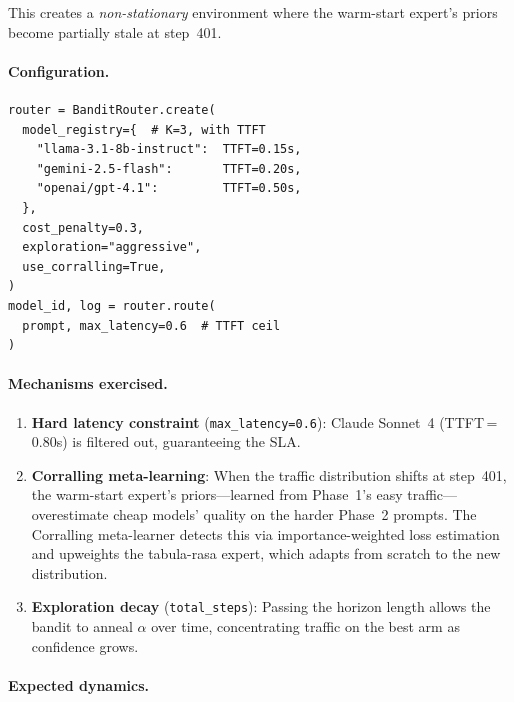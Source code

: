 \noindent This creates a \emph{non-stationary} environment where the warm-start expert's priors become partially stale at step~401.

\paragraph{Configuration.}

{\small\begin{verbatim}
router = BanditRouter.create(
  model_registry={  # K=3, with TTFT
    "llama-3.1-8b-instruct":  TTFT=0.15s,
    "gemini-2.5-flash":       TTFT=0.20s,
    "openai/gpt-4.1":         TTFT=0.50s,
  },
  cost_penalty=0.3,
  exploration="aggressive",
  use_corralling=True,
)
model_id, log = router.route(
  prompt, max_latency=0.6  # TTFT ceil
)
\end{verbatim}}

\paragraph{Mechanisms exercised.}

\begin{enumerate}[nosep,leftmargin=*]
    \item \textbf{Hard latency constraint} (\texttt{max\_latency=0.6}): Claude Sonnet~4 (TTFT\,=\,0.80s) is filtered out, guaranteeing the SLA.

    \item \textbf{Corralling meta-learning}: When the traffic distribution shifts at step~401, the warm-start expert's priors---learned from Phase~1's easy traffic---overestimate cheap models' quality on the harder Phase~2 prompts.  The Corralling meta-learner detects this via importance-weighted loss estimation and upweights the tabula-rasa expert, which adapts from scratch to the new distribution.

    \item \textbf{Exploration decay} (\texttt{total\_steps}): Passing the horizon length allows the bandit to anneal $\alpha$ over time, concentrating traffic on the best arm as confidence grows.
\end{enumerate}

\paragraph{Expected dynamics.}

